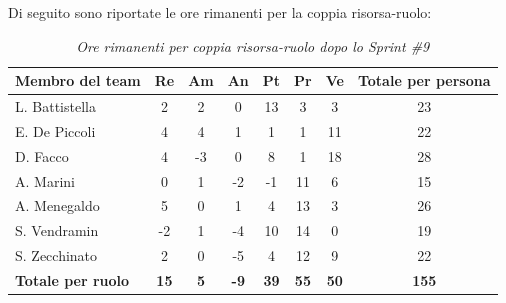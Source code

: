 ﻿\documentclass[a4paper, 10pt, colorlinks=true, linkcolor=black, urlcolor=blue, citecolor=blue, hidelinks]{article}
\renewcommand{\arraystretch}{1.2}
\begin{document}
Di seguito sono riportate le ore rimanenti per la coppia risorsa-ruolo:

\begin{table}[H]
    \centering
    \renewcommand{\arraystretch}{1.4}
    \begin{tabular}{|l|c|c|c|c|c|c|c|}
        \hline
        \rowcolor{bluBitless!15}
        \textbf{Membro del team} & \textbf{Re} & \textbf{Am} & \textbf{An} & \textbf{Pt} & \textbf{Pr} & \textbf{Ve} & \textbf{Totale per persona} \\
        \hline
        L. Battistella & 2 & 2 & 0 & 13 & 3 & 3 & 23 \\ \hline
        E. De Piccoli & 4 & 4 & 1 & 1 & 1 & 11 & 22 \\ \hline
        D. Facco & 4 & -3 & 0 & 8 & 1 & 18 & 28 \\ \hline
        A. Marini & 0 & 1 & -2 & -1 & 11 & 6 & 15 \\ \hline
        A. Menegaldo & 5 & 0 & 1 & 4 & 13 & 3 & 26 \\ \hline
        S. Vendramin & -2 & 1 & -4 & 10 & 14 & 0 & 19 \\ \hline
        S. Zecchinato & 2 & 0 & -5 & 4 & 12 & 9 & 22 \\ \hline
        \rowcolor{bluBitless!8}
        \textbf{Totale per ruolo} & \textbf{15} & \textbf{5} & \textbf{-9} & \textbf{39} & \textbf{55} & \textbf{50} & \textbf{155} \\
        \hline
    \end{tabular}
    \caption{\textit{Ore rimanenti per coppia risorsa-ruolo dopo lo Sprint \#9}}
\end{table}
\end{document}
